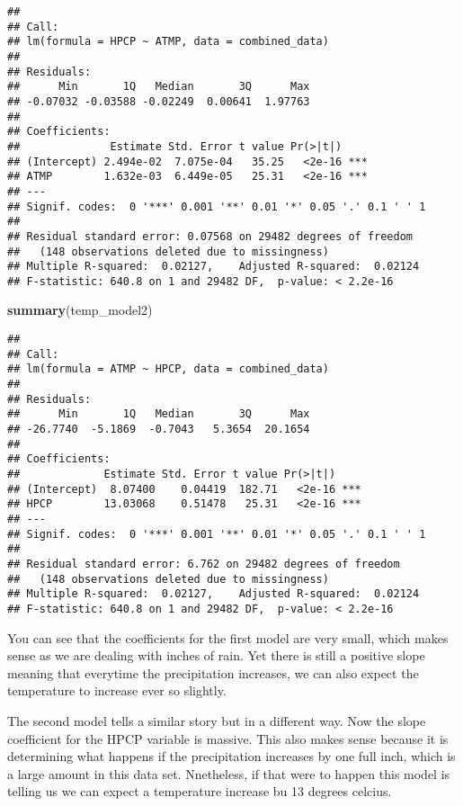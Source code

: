 \documentclass[
]{article}
\newenvironment{Shaded}{\begin{snugshade}}{\end{snugshade}}
\newcommand{\FunctionTok}[1]{\textcolor[rgb]{0.13,0.29,0.53}{\textbf{#1}}}
\newcommand{\NormalTok}[1]{#1}
\begin{document}
\begin{verbatim}
## 
## Call:
## lm(formula = HPCP ~ ATMP, data = combined_data)
## 
## Residuals:
##      Min       1Q   Median       3Q      Max 
## -0.07032 -0.03588 -0.02249  0.00641  1.97763 
## 
## Coefficients:
##              Estimate Std. Error t value Pr(>|t|)    
## (Intercept) 2.494e-02  7.075e-04   35.25   <2e-16 ***
## ATMP        1.632e-03  6.449e-05   25.31   <2e-16 ***
## ---
## Signif. codes:  0 '***' 0.001 '**' 0.01 '*' 0.05 '.' 0.1 ' ' 1
## 
## Residual standard error: 0.07568 on 29482 degrees of freedom
##   (148 observations deleted due to missingness)
## Multiple R-squared:  0.02127,    Adjusted R-squared:  0.02124 
## F-statistic: 640.8 on 1 and 29482 DF,  p-value: < 2.2e-16
\end{verbatim}

\begin{Shaded}
\begin{Highlighting}[]
\FunctionTok{summary}\NormalTok{(temp\_model2)}
\end{Highlighting}
\end{Shaded}

\begin{verbatim}
## 
## Call:
## lm(formula = ATMP ~ HPCP, data = combined_data)
## 
## Residuals:
##      Min       1Q   Median       3Q      Max 
## -26.7740  -5.1869  -0.7043   5.3654  20.1654 
## 
## Coefficients:
##             Estimate Std. Error t value Pr(>|t|)    
## (Intercept)  8.07400    0.04419  182.71   <2e-16 ***
## HPCP        13.03068    0.51478   25.31   <2e-16 ***
## ---
## Signif. codes:  0 '***' 0.001 '**' 0.01 '*' 0.05 '.' 0.1 ' ' 1
## 
## Residual standard error: 6.762 on 29482 degrees of freedom
##   (148 observations deleted due to missingness)
## Multiple R-squared:  0.02127,    Adjusted R-squared:  0.02124 
## F-statistic: 640.8 on 1 and 29482 DF,  p-value: < 2.2e-16
\end{verbatim}

You can see that the coefficients for the first model are very small,
which makes sense as we are dealing with inches of rain. Yet there is
still a positive slope meaning that everytime the precipitation
increases, we can also expect the temperature to increase ever so
slightly.

The second model tells a similar story but in a different way. Now the
slope coefficient for the HPCP variable is massive. This also makes
sense because it is determining what happens if the precipitation
increases by one full inch, which is a large amount in this data set.
Nnetheless, if that were to happen this model is telling us we can
expect a temperature increase bu 13 degrees celcius.
\end{document}
